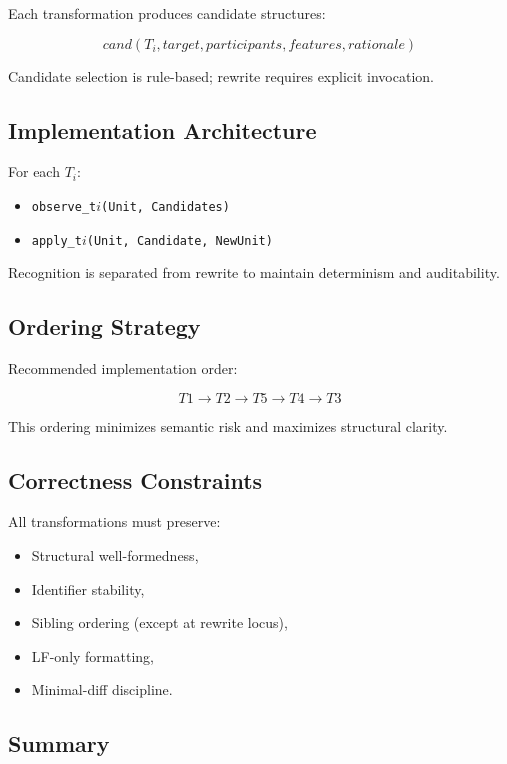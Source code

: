 \documentclass[12pt,twoside,a4paper]{article}
\begin{document}
Each transformation produces candidate structures:

\[
cand(T_i, target, participants, features, rationale)
\]

Candidate selection is rule-based; rewrite requires explicit invocation.

\subsection{Implementation Architecture}

For each $T_i$:

\begin{itemize}
  \item \texttt{observe\_t$i$(Unit, Candidates)}
  \item \texttt{apply\_t$i$(Unit, Candidate, NewUnit)}
\end{itemize}

Recognition is separated from rewrite to maintain determinism and auditability.

\subsection{Ordering Strategy}

Recommended implementation order:

\[
T1 \rightarrow T2 \rightarrow T5 \rightarrow T4 \rightarrow T3
\]

This ordering minimizes semantic risk and maximizes structural clarity.

\subsection{Correctness Constraints}

All transformations must preserve:

\begin{itemize}
  \item Structural well-formedness,
  \item Identifier stability,
  \item Sibling ordering (except at rewrite locus),
  \item LF-only formatting,
  \item Minimal-diff discipline.
\end{itemize}

\subsection{Summary}
\end{document}
